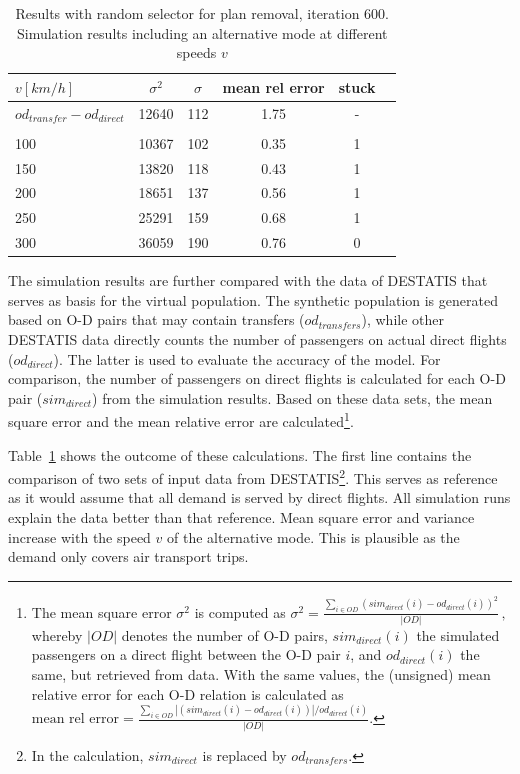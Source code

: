 \begin{table}[t]
\centering
		\begin{tabular}{@{}l|ccccc@{}}
			$v [km/h]$ & $\sigma^2$ & $\sigma$ & mean rel error  & stuck \\
\hline
 $od_{transfer} - od_{direct}$ &  12640 & 112 & 1.75 & - \\
 \\
 100	& 10367 & 102 & %
 0.35%
 &  %
 1
 \\	%
 150	& 13820 & 118 & 0.43 &  1 \\	%
 200 & 18651 & 137 & 0.56 &  1 \\	%
 250 & 25291 & 159 & 0.68 & 1 \\	%
 300 & 36059 & 190 & 0.76 & 0 \\	%
		\end{tabular}
		\caption{Results with random selector for plan removal, iteration 600. Simulation results including an alternative mode at different speeds $v$}
		\label{tab:2009_results_alternative_mode_psl}
\end{table}

The simulation results are further compared with the data of DESTATIS that serves as basis for the virtual population.  
The synthetic population is generated based on O-D pairs that may contain transfers ($od_{transfers}$), 
while other DESTATIS data directly counts the number of passengers on actual direct flights ($od_{direct}$). %
The latter is used to evaluate the accuracy of the model.
For comparison, the number of passengers on direct flights is calculated for each O-D pair ($sim_{direct}$) from the simulation results.
Based on these data sets, the mean square error and the mean relative error are calculated\footnote{
The mean square error $\sigma^2$ is computed as
	$\sigma^2 = \frac{\sum_{i \in OD} (sim_{direct}(i) - od_{direct}(i))^2}{|OD|} \, , $
whereby $|OD|$ denotes the number of O-D pairs, $sim_{direct}(i)$ the simulated passengers on a direct flight between the O-D pair $i$, and $od_{direct}(i)$ the same, but retrieved from data.  
With the same values, the (unsigned) mean relative error for each O-D relation is calculated as
$
\mbox{mean rel error} = \frac{\sum_{i \in OD} |(sim_{direct}(i) - od_{direct}(i))|/ od_{direct}(i)}{|OD|}.
$
}. 

Table~\ref{tab:2009_results_alternative_mode_psl} shows the outcome of these calculations. 
The first line contains the comparison of two sets of input data from DESTATIS\footnote{In the calculation, $sim_{direct}$ is replaced by $od_{transfers}$.}. 
This serves as reference as it would assume that all demand is served by direct flights.
All simulation runs explain the data better than that reference.
Mean square error and variance increase with the speed $v$ of the alternative mode.  
This is plausible as the demand only covers air transport trips. 

